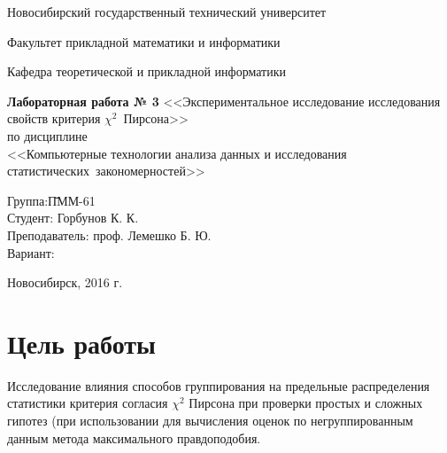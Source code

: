 \documentclass[a4paper,14pt]{extarticle}
\begin{document}
\setcounter{secnumdepth}{0}

\begin{titlepage}

	\begin{center}
		Новосибирский государственный технический университет
		
		Факультет прикладной математики и информатики
		
		Кафедра теоретической и прикладной информатики
		
		\vspace{250pt}
		
		\textbf{\LARGE{Лабораторная работа № 3}}
		\medbreak
		\large{<<Экспериментальное исследование исследования свойств критерия 
			$\chi^2$~Пирсона>>} \\
		\medbreak
		\small{по дисциплине \\
		\medbreak
		<<Компьютерные технологии анализа данных и исследования 
	статистических~закономерностей>>}
		\vspace{100pt}
	\end{center}

	\begin{flushleft}
		\begin{tabbing}
			Группа:\qquad\qquad \= ПММ-61\\
			Студент:            \> Горбунов К. К.\\
			Преподаватель:      \> проф. Лемешко Б. Ю.\\
			Вариант:             \\
		\end{tabbing}
	\end{flushleft}

	\begin{center}
		\vspace{\fill}
		Новосибирск, 2016 г.
	\end{center}

\end{titlepage}

\newpage

\section{Цель работы}

Исследование влияния способов группирования на предельные распределения
статистики критерия согласия $\chi^2$ Пирсона при проверки простых и сложных
гипотез (при использовании для вычисления оценок по негруппированным данным
метода максимального правдоподобия.
\end{document}
